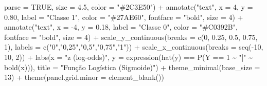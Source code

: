 \documentclass[
  letterpaper,
  DIV=11,
  numbers=noendperiod]{scrartcl}
\newenvironment{Shaded}{\begin{snugshade}}{\end{snugshade}}
\newcommand{\AttributeTok}[1]{\textcolor[rgb]{0.40,0.45,0.13}{#1}}
\newcommand{\ConstantTok}[1]{\textcolor[rgb]{0.56,0.35,0.01}{#1}}
\newcommand{\DecValTok}[1]{\textcolor[rgb]{0.68,0.00,0.00}{#1}}
\newcommand{\FloatTok}[1]{\textcolor[rgb]{0.68,0.00,0.00}{#1}}
\newcommand{\FunctionTok}[1]{\textcolor[rgb]{0.28,0.35,0.67}{#1}}
\newcommand{\NormalTok}[1]{\textcolor[rgb]{0.00,0.23,0.31}{#1}}
\newcommand{\SpecialCharTok}[1]{\textcolor[rgb]{0.37,0.37,0.37}{#1}}
\newcommand{\StringTok}[1]{\textcolor[rgb]{0.13,0.47,0.30}{#1}}
\begin{document}
\begin{Shaded}
\begin{Highlighting}[]
           \AttributeTok{parse =} \ConstantTok{TRUE}\NormalTok{, }\AttributeTok{size =} \FloatTok{4.5}\NormalTok{, }\AttributeTok{color =} \StringTok{"\#2C3E50"}\NormalTok{) }\SpecialCharTok{+}
  \FunctionTok{annotate}\NormalTok{(}\StringTok{"text"}\NormalTok{, }\AttributeTok{x =} \DecValTok{4}\NormalTok{, }\AttributeTok{y =} \FloatTok{0.80}\NormalTok{, }\AttributeTok{label =} \StringTok{"Classe 1"}\NormalTok{, }\AttributeTok{color =} \StringTok{"\#27AE60"}\NormalTok{,}
           \AttributeTok{fontface =} \StringTok{"bold"}\NormalTok{, }\AttributeTok{size =} \DecValTok{4}\NormalTok{) }\SpecialCharTok{+}
  \FunctionTok{annotate}\NormalTok{(}\StringTok{"text"}\NormalTok{, }\AttributeTok{x =} \SpecialCharTok{{-}}\DecValTok{4}\NormalTok{, }\AttributeTok{y =} \FloatTok{0.18}\NormalTok{, }\AttributeTok{label =} \StringTok{"Classe 0"}\NormalTok{, }\AttributeTok{color =} \StringTok{"\#C0392B"}\NormalTok{,}
           \AttributeTok{fontface =} \StringTok{"bold"}\NormalTok{, }\AttributeTok{size =} \DecValTok{4}\NormalTok{) }\SpecialCharTok{+}
  \FunctionTok{scale\_y\_continuous}\NormalTok{(}\AttributeTok{breaks =} \FunctionTok{c}\NormalTok{(}\DecValTok{0}\NormalTok{, }\FloatTok{0.25}\NormalTok{, }\FloatTok{0.5}\NormalTok{, }\FloatTok{0.75}\NormalTok{, }\DecValTok{1}\NormalTok{),}
                     \AttributeTok{labels =} \FunctionTok{c}\NormalTok{(}\StringTok{"0"}\NormalTok{,}\StringTok{"0,25"}\NormalTok{,}\StringTok{"0,5"}\NormalTok{,}\StringTok{"0,75"}\NormalTok{,}\StringTok{"1"}\NormalTok{)) }\SpecialCharTok{+}
  \FunctionTok{scale\_x\_continuous}\NormalTok{(}\AttributeTok{breaks =} \FunctionTok{seq}\NormalTok{(}\SpecialCharTok{{-}}\DecValTok{10}\NormalTok{, }\DecValTok{10}\NormalTok{, }\DecValTok{2}\NormalTok{)) }\SpecialCharTok{+}
  \FunctionTok{labs}\NormalTok{(}\AttributeTok{x =} \StringTok{"z  (log{-}odds)"}\NormalTok{, }\AttributeTok{y =} \FunctionTok{expression}\NormalTok{(}\FunctionTok{hat}\NormalTok{(y) }\SpecialCharTok{==} \FunctionTok{P}\NormalTok{(Y }\SpecialCharTok{==} \DecValTok{1} \SpecialCharTok{\textasciitilde{}} \StringTok{"|"} \SpecialCharTok{\textasciitilde{}} \FunctionTok{bold}\NormalTok{(x))),}
       \AttributeTok{title =} \StringTok{"Função Logística (Sigmoide)"}\NormalTok{) }\SpecialCharTok{+}
  \FunctionTok{theme\_minimal}\NormalTok{(}\AttributeTok{base\_size =} \DecValTok{13}\NormalTok{) }\SpecialCharTok{+}
  \FunctionTok{theme}\NormalTok{(}\AttributeTok{panel.grid.minor =} \FunctionTok{element\_blank}\NormalTok{())}
\end{Highlighting}
\end{Shaded}
\end{document}
